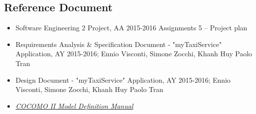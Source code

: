 \subsection{Reference Document}
\begin{itemize}
    \item Software Engineering 2 Project, AA 2015-2016 Assignments 5 – Project plan 
    \item Requirements Analysis \& Specification Document - "myTaxiService" Application, AY 2015-2016; Ennio Visconti, Simone Zocchi, Khanh Huy Paolo Tran
    \item Design Document - "myTaxiService" Application, AY 2015-2016; Ennio Visconti, Simone Zocchi, Khanh Huy Paolo Tran
    \item \href{http://csse.usc.edu/csse/research/COCOMOII/cocomo2000.0/CII_modelman2000.0.pdf}{\textit{COCOMO II Model Definition Manual}}
\end{itemize}